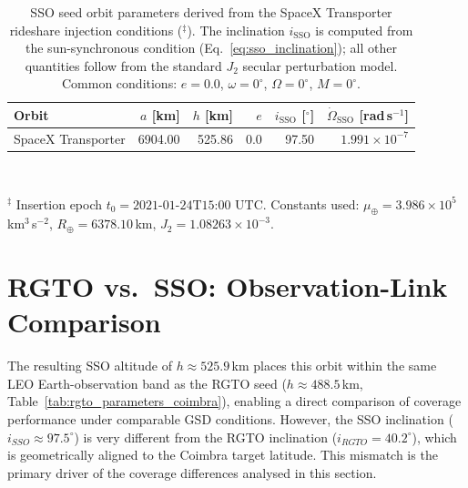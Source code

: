 \begin{table}[H]
\centering
\caption{\footnotesize{SSO seed orbit parameters derived from the SpaceX Transporter rideshare injection conditions ($^{\ddagger}$).  The inclination $i_{\mathrm{SSO}}$ is computed from the sun-synchronous condition (Eq.~\eqref{eq:sso_inclination}); all other quantities follow from the standard $J_2$ secular perturbation model.  Common conditions: $e = 0.0$, $\omega = 0^{\circ}$, $\Omega = 0^{\circ}$, $M = 0^{\circ}$.}}
\label{tab:sso_seed_parameters}
\smallskip
\footnotesize
\setlength{\tabcolsep}{4pt}
\begin{tabular}{l r r r r r }
\toprule
Orbit
  & $a$ [km]
  & $h$ [km]
  & $e$
  & $i_{\mathrm{SSO}}$ [$^{\circ}$]
  & $\dot{\Omega}_{\mathrm{SSO}}$ [rad\,s$^{-1}$]
  \\
\midrule
SpaceX Transporter & 6904.00 & 525.86 & 0.0 & 97.50 & $1.991{\times}10^{-7}$ \\
\bottomrule
\end{tabular}
\\[2pt]
{\footnotesize \parbox{0.97\linewidth}{$^{\ddagger}$ Insertion epoch $t_0 = \text{2021-01-24T15:00 UTC}$.  Constants used: $\mu_{\oplus} = 3.986{\times}10^{5}$\,km$^{3}$\,s$^{-2}$, $R_{\oplus} = 6378.10$\,km, $J_2 = 1.08263{\times}10^{-3}$.}}
\end{table}

\section{RGTO vs.\ SSO: Observation-Link Comparison}
\label{sct-rgto_vs_sso}

The resulting SSO altitude of $h \approx 525.9$\,km places this orbit within the same LEO Earth-observation band as the RGTO seed ($h \approx 488.5$\,km, Table~\ref{tab:rgto_parameters_coimbra}), enabling a direct comparison of coverage performance under comparable GSD conditions.  However, the SSO inclination ($i_{SSO} \approx 97.5^{\circ}$) is very different from the RGTO inclination ($i_{RGTO} = 40.2^{\circ}$), which is geometrically aligned to the Coimbra target latitude.  This mismatch is the primary driver of the coverage differences analysed in this section.

